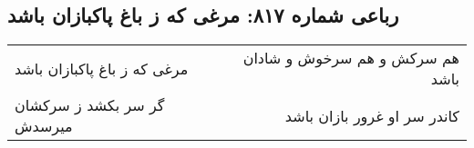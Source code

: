 \begin{center}
\section*{رباعی شماره ۸۱۷: مرغی که ز باغ پاکبازان باشد}
\label{sec:0817}
\begin{longtable}{l p{0.5cm} r}
مرغی که ز باغ پاکبازان باشد
&&
هم سرکش و هم سرخوش و شادان باشد
\\
گر سر بکشد ز سرکشان میرسدش
&&
کاندر سر او غرور بازان باشد
\\
\end{longtable}
\end{center}
